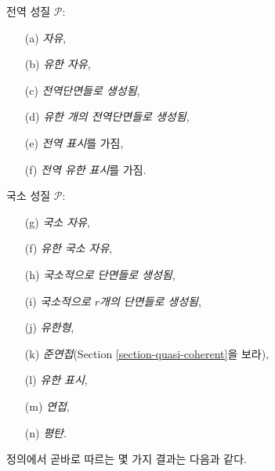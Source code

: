 \medskip\noindent
전역 성질 $\mathcal{P}$:
\begin{enumerate}
\item[(a)] {\it 자유},
\item[(b)] {\it 유한 자유},
\item[(c)] {\it 전역단면들로 생성됨},
\item[(d)] {\it 유한 개의 전역단면들로 생성됨},
\item[(e)] {\it 전역 표시}를 가짐,
\item[(f)] {\it 전역 유한 표시}를 가짐.
\end{enumerate}
국소 성질 $\mathcal{P}$:
\begin{enumerate}
\item[(g)] {\it 국소 자유},
\item[(f)] {\it 유한 국소 자유},
\item[(h)] {\it 국소적으로 단면들로 생성됨},
\item[(i)] {\it 국소적으로 $r$개의 단면들로 생성됨},
\item[(j)] {\it 유한형},
\item[(k)] {\it 준연접}(Section \ref{section-quasi-coherent}을 보라),
\item[(l)] {\it 유한 표시},
\item[(m)] {\it 연접},
\item[(n)] {\it 평탄}.
\end{enumerate}
정의에서 곧바로 따르는 몇 가지 결과는 다음과 같다.
